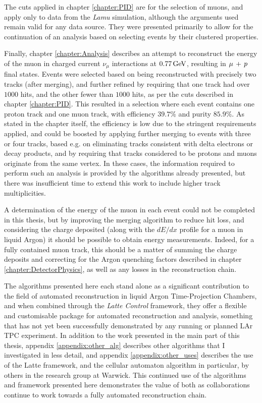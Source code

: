 The cuts applied in chapter \ref{chapter:PID} are for the selection of muons, and apply only to data from the \emph{Lamu} simulation, although the arguments used remain valid for any data source. They were presented primarily to allow for the continuation of an analysis based on selecting events by their clustered properties.

Finally, chapter \ref{chapter:Analysis} describes an attempt to reconstruct the energy of the muon in charged current $\nu_\mu$ interactions at $0.77\,\mathrm{GeV}$, resulting in $\mu\,+\,p$ final states. Events were selected based on being reconstructed with precisely two tracks (after merging), and further refined by requiring that one track had over $1000$ hits, and the other fewer than $1000$ hits, as per the cuts described in chapter \ref{chapter:PID}. This resulted in a selection where each event contains one proton track and one muon track, with efficiency $39.7\%$ and purity $85.9\%$. As stated in the chapter itself, the efficiency is low due to the stringent requirements applied, and could be boosted by applying further merging to events with three or four tracks, based e.g. on eliminating tracks consistent with delta electrons or decay products, and by requiring that tracks considered to be protons and muons originate from the same vertex. In these cases, the information required to perform such an analysis is provided by the algorithms already presented, but there was insufficient time to extend this work to include higher track multiplicities.

A determination of the energy of the muon in each event could not be completed in this thesis, but by improving the merging algorithm to reduce hit loss, and considering the charge deposited (along with the $dE/dx$ profile for a muon in liquid Argon) it should be possible to obtain energy measurements. Indeed, for a fully contained muon track, this should be a matter of summing the charge deposits and correcting for the Argon quenching factors described in chapter \ref{chapter:DetectorPhysics}, as well as any losses in the reconstruction chain.

The algorithms presented here each stand alone as a significant contribution to the field of automated reconstruction in liquid Argon Time-Projection Chambers, and when combined through the \emph{Latte Control} framework, they offer a flexible and customisable package for automated reconstruction and analysis, something that has not yet been successfully demonstrated by any running or planned \ac{LAr TPC} experiment. In addition to the work presented in the main part of this thesis, appendix \ref{appendix:other_alg} describes other algorithms that I investigated in less detail, and appendix \ref{appendix:other_uses} describes the use of the Latte framework, and the cellular automaton algorithm in particular, by others in the research group at Warwick. This continued use of the algorithms and framework presented here demonstrates the value of both as collaborations continue to work towards a fully automated reconstruction chain.
